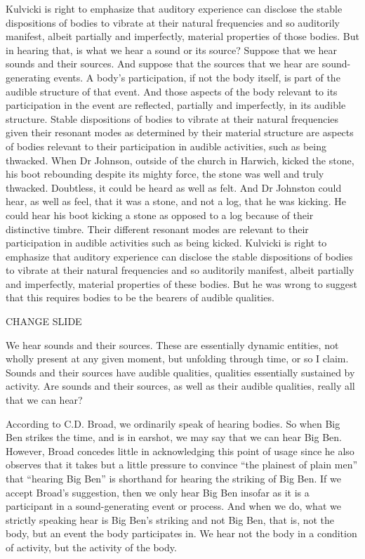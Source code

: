 \documentclass[12pt]{article}
\begin{document}
Kulvicki is right to emphasize that auditory experience can disclose the stable dispositions of bodies to vibrate at their natural frequencies and so auditorily manifest, albeit partially and imperfectly, material properties of those bodies. But in hearing that, is what we hear a sound or its source? Suppose that we hear sounds and their sources. And suppose that the sources that we hear are sound-generating events. A body’s participation, if not the body itself, is part of the audible structure of that event. And those aspects of the body relevant to its participation in the event are reflected, partially and imperfectly, in its audible structure. Stable dispositions of bodies to vibrate at their natural frequencies given their resonant modes as determined by their material structure are aspects of bodies relevant to their participation in audible activities, such as being thwacked. When Dr Johnson, outside of the church in Harwich, kicked the stone, his boot rebounding despite its mighty force, the stone was well and truly thwacked. Doubtless, it could be heard as well as felt. And Dr Johnston could hear, as well as feel, that it was a stone, and not a log, that he was kicking. He could hear his boot kicking a stone as opposed to a log because of their distinctive timbre. Their different resonant modes are relevant to their participation in audible activities such as being kicked. Kulvicki is right to emphasize that auditory experience can disclose the stable dispositions of bodies to vibrate at their natural frequencies and so auditorily manifest, albeit partially and imperfectly, material properties of these bodies. But he was wrong to suggest that this requires bodies to be the bearers of audible qualities. 

CHANGE SLIDE

We hear sounds and their sources. These are essentially dynamic entities, not wholly present at any given moment, but unfolding through time, or so I claim. Sounds and their sources have audible qualities, qualities essentially sustained by activity. Are sounds and their sources, as well as their audible qualities, really all that we can hear?

According to C.D. Broad, we ordinarily speak of hearing bodies. So when Big Ben strikes the time, and is in earshot, we may say that we can hear Big Ben. However, Broad concedes little in acknowledging this point of usage since he also observes that it takes but a little pressure to convince “the plainest of plain men” that “hearing Big Ben” is shorthand for hearing the striking of Big Ben. If we accept Broad’s suggestion, then we only hear Big Ben insofar as it is a participant in a sound-generating event or process. And when we do, what we strictly speaking hear is Big Ben’s striking and not Big Ben, that is, not the body, but an event the body participates in. We hear not the body in a condition of activity, but the activity of the body.
\end{document}
